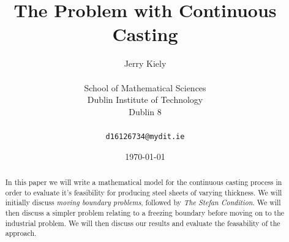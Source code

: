 \documentclass{report}
\begin{document}
\title{The Problem with Continuous Casting}
\author{Jerry Kiely\\
  \\
  School of Mathematical Sciences\\
  Dublin Institute of Technology\\
  Dublin 8\\
  \\
  \texttt{d16126734@mydit.ie}}
\date{\today}
\maketitle







\tableofcontents







\begin{abstract}
In this paper we will write a mathematical model for the continuous casting process in order to 
evaluate it's  feasibility for producing steel sheets of varying thickness. We will initially discuss 
\emph{moving boundary problems}, followed by \emph{The Stefan Condition}. We will then discuss a simpler 
problem relating to a freezing boundary before moving on to the industrial problem. We will then discuss 
our results and evaluate the feasability of the approach.
\end{abstract}
\end{document}
